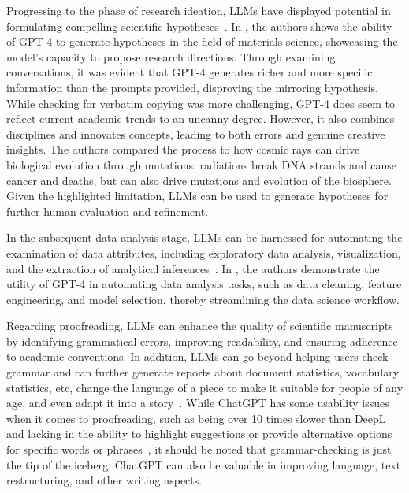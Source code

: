 Progressing to the phase of research ideation, LLMs have displayed potential in formulating compelling scientific hypotheses~\cite{park2023chatgpt}.
In \textcite{park2023chatgpt}, the authors shows the ability of GPT-4 to generate hypotheses in the field of materials science, showcasing the model's capacity to propose research directions.
Through examining conversations, it was evident that GPT-4 generates richer and more specific information than the prompts provided, disproving the mirroring hypothesis.
While checking for verbatim copying was more challenging, GPT-4 does seem to reflect current academic trends to an uncanny degree.
However, it also combines disciplines and innovates concepts, leading to both errors and genuine creative insights.
The authors compared the process to how cosmic rays can drive biological evolution through mutations: radiations break DNA strands and cause cancer and deaths, but can also drive mutations and evolution of the biosphere.
Given the highlighted limitation, LLMs can be used to generate hypotheses for further human evaluation and refinement.

In the subsequent data analysis stage, LLMs can be harnessed for automating the examination of data attributes, including exploratory data analysis, visualization, and the extraction of analytical inferences~\cite{cheng2023gpt4dataanalyst}.
In \textcite{hassan2023chatgptdatascientist}, the authors demonstrate the utility of GPT-4 in automating data analysis tasks, such as data cleaning, feature engineering, and model selection, thereby streamlining the data science workflow.

Regarding proofreading, LLMs can enhance the quality of scientific manuscripts by identifying grammatical errors, improving readability, and ensuring adherence to academic conventions.
In addition, LLMs can go beyond helping users check grammar and can further generate reports about document statistics, vocabulary statistics, etc, change the language of a piece to make it suitable for people of any age, and even adapt it into a story~\cite{kim2022replacegrammarly}.
While ChatGPT has some usability issues when it comes to proofreading, such as being over 10 times slower than DeepL and lacking in the ability to highlight suggestions or provide alternative options for specific words or phrases~\cite{maximov2023englishgrammar}, it should be noted that grammar-checking is just the tip of the iceberg.
ChatGPT can also be valuable in improving language, text restructuring, and other writing aspects.

